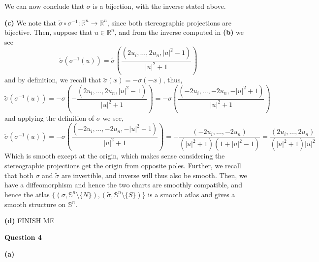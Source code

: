 \documentclass[10pt]{article}
\newcommand{\R}{\mathbb{R}}
\newcommand{\Sp}{\mathbb{S}}
\begin{document}
We can now conclude that $\sigma$ is a bijection, with the inverse stated above.

\textbf{(c)} We note that $\tilde{\sigma} \circ \sigma^{-1}: \R^{n} \to \R^{n}$, since both stereographic projections are bijective. Then, suppose that $u\in\R^{n}$, and from the inverse computed in \textbf{(b)} we see
$$\tilde{\sigma}(\sigma^{-1}(u)) = \tilde{\sigma}\left(\frac{(2u_{i},\dots,2u_{n},|u|^{2}-1)}{|u|^{2} + 1}\right)$$
and by definition, we recall that $\tilde{\sigma}(x) = -\sigma(-x)$, thus,
$$\tilde{\sigma}(\sigma^{-1}(u)) = -\sigma\left(-\frac{(2u_{i},\dots,2u_{n},|u|^{2}-1)}{|u|^{2} + 1}\right) = -\sigma\left(\frac{(-2u_{i},\dots,-2u_{n},-|u|^{2}+1)}{|u|^{2} + 1}\right)$$
and applying the definition of $\sigma$ we see,
$$\tilde{\sigma}(\sigma^{-1}(u)) = -\sigma\left(\frac{(-2u_{i},\dots,-2u_{n},-|u|^{2}+1)}{|u|^{2} + 1}\right) = -\frac{(-2u_{i},\dots,-2u_{n})}{(|u|^{2} + 1)(1 + |u|^{2} - 1)} = \frac{(2u_{i},\dots,2u_{n})}{(|u|^{2} + 1)|u|^{2}}$$
Which is smooth except at the origin, which makes sense considering the stereographic projections get the origin from opposite poles. Further, we recall that both $\sigma$ and $\tilde{\sigma}$ are invertible, and inverse will thus also be smooth. Then, we have a diffeomorphism and hence the two charts are smoothly compatible, and hence the atlas $\{(\sigma,\Sp^{n}\setminus \{N\}),(\tilde{\sigma},\Sp^{n}\setminus \{S\})\}$ is a smooth atlas and gives a smooth structure on $\Sp^{n}$.

\textbf{(d)} FINISH ME

\newpage

\textbf{Question 4}

\textbf{(a)}
\end{document}

